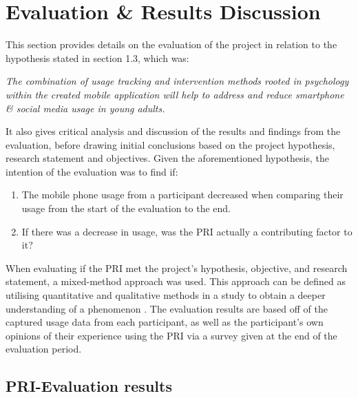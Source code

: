\documentclass[12pt]{article}
\begin{document}
\newpage


\section{Evaluation \& Results Discussion}
This section provides details on the evaluation of the project in relation to the hypothesis stated in section 1.3, which was: \newline

\noindent\textit{The combination of usage tracking and intervention methods rooted in psychology within the created mobile 
application will help to address and reduce smartphone \& social media usage in young adults.} \newline

It also gives critical analysis and discussion of the results and findings from the evaluation, before drawing initial conclusions based on the
project hypothesis, research statement and objectives. Given the aforementioned hypothesis, the intention of the evaluation was to find if:

\begin{enumerate}
	\item The mobile phone usage from a participant decreased when comparing their usage from the start of the evaluation to the end.
	\item If there was a decrease in usage, was the PRI actually a contributing factor to it?
\end{enumerate}

\noindent When evaluating if the PRI met the project's hypothesis, objective, and research statement, a mixed-method approach was used. This approach can be defined as utilising quantitative and
qualitative methods in a study to obtain a deeper understanding of a phenomenon \autocite{RefWorks:RefID:171-johnson2007definition}. The evaluation results are based off of the captured usage 
data from each participant, as well as the participant's own opinions of their experience using the PRI via a survey given at the end of the evaluation period. 

\subsection{PRI-Evaluation results}
\end{document}
